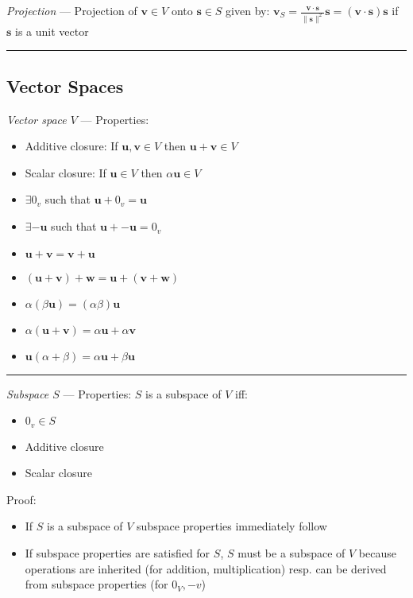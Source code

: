 \emph{Projection} --- Projection of $\boldsymbol{v} \in V$ onto $\boldsymbol{s} \in S$ given by: $\boldsymbol{v}_S = \frac{\boldsymbol{v} \cdot \boldsymbol{s}}{\|\boldsymbol{s}\|^2}\boldsymbol{s} = (\boldsymbol{v} \cdot \boldsymbol{s})\boldsymbol{s}$ if $\boldsymbol{s}$ is a unit vector

{\color{black}\hrule height 0.001mm}

\subsection*{Vector Spaces}
\emph{Vector space $V$} --- Properties:
\begin{multicols}{2}
\begin{itemize}
    \item Additive closure: If $\boldsymbol{u},\boldsymbol{v} \in V$ then $\boldsymbol{u} + \boldsymbol{v} \in V$ 
    \item Scalar closure: If $\boldsymbol{u} \in V$ then $\alpha\boldsymbol{u} \in V$ 
    \item $\exists 0_v$ such that $\boldsymbol{u} + 0_v = \boldsymbol{u}$
    \item $\exists \boldsymbol{-u}$ such that $\boldsymbol{u} + \boldsymbol{-u} = 0_v$
    \item $\boldsymbol{u} + \boldsymbol{v} = \boldsymbol{v} + \boldsymbol{u}$ 
    \item $(\boldsymbol{u} + \boldsymbol{v}) + \boldsymbol{w} = \boldsymbol{u} + (\boldsymbol{v} + \boldsymbol{w})$ 
    \item $\alpha(\beta\boldsymbol{u})= (\alpha\beta)\boldsymbol{u}$ 
    \item $\alpha(\boldsymbol{u} + \boldsymbol{v}) = \alpha\boldsymbol{u} + \alpha\boldsymbol{v}$ 
    \item $\boldsymbol{u}(\alpha + \beta) = \alpha\boldsymbol{u} + \beta\boldsymbol{u}$ 
\end{itemize}
\end{multicols}

{\color{lightgray}\hrule height 0.001mm}

\emph{Subspace $S$} --- Properties:
$S$ is a subspace of $V$ iff:
\begin{multicols}{2}
\begin{itemize}
    \item $0_v \in S$
    \item Additive closure
    \item Scalar closure
\end{itemize}
\end{multicols}
Proof:
\begin{itemize}
    \item If $S$ is a subspace of $V$ subspace properties immediately follow
    \item If subspace properties are satisfied for $S$, $S$  must be a subspace of $V$ because operations are inherited (for addition, multiplication) resp. can be derived from subspace properties (for $0_V, -v$)
\end{itemize}

